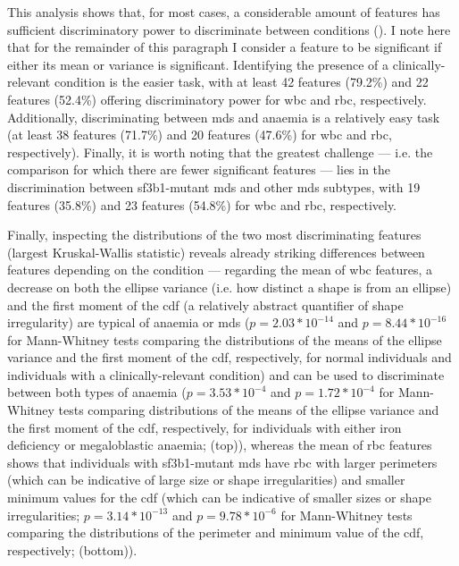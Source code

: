This analysis shows that, for most cases, a considerable amount of features has sufficient discriminatory power to discriminate between conditions (). I note here that for the remainder of this paragraph I consider a feature to be significant if either its mean or variance is significant. Identifying the presence of a clinically-relevant condition is the easier task, with at least 42 features (79.2\%) and 22 features (52.4\%) offering discriminatory power for \ac{wbc} and \ac{rbc}, respectively. Additionally, discriminating between \ac{mds} and anaemia is a relatively easy task (at least 38 features (71.7\%) and 20 features (47.6\%) for \ac{wbc} and \ac{rbc}, respectively). Finally, it is worth noting that the greatest challenge --- i.e. the comparison for which there are fewer significant features --- lies in the discrimination between \ac{sf3b1}-mutant \ac{mds} and other \ac{mds} subtypes, with 19 features (35.8\%) and 23 features (54.8\%) for \ac{wbc} and \ac{rbc}, respectively. 

\begin{figure}[!ht]
    \label{fig:dunn-test-heatmap}
\end{figure}

Finally, inspecting the distributions of the two most discriminating features (largest Kruskal-Wallis statistic) reveals already striking differences between features depending on the condition --- regarding the mean of \ac{wbc} features, a decrease on both the ellipse variance (i.e. how distinct a shape is from an ellipse) and the first moment of the \ac{cdf} (a relatively abstract quantifier of shape irregularity) are typical of anaemia or \ac{mds} ($p=2.03*10^{-14}$ and $p=8.44*10^{-16}$ for Mann-Whitney tests comparing the distributions of the means of the ellipse variance and the first moment of the \ac{cdf}, respectively, for normal individuals and individuals with a clinically-relevant condition) and can be used to discriminate between both types of anaemia ($p=3.53*10^{-4}$ and $p=1.72*10^{-4}$ for Mann-Whitney tests comparing distributions of the means of the ellipse variance and the first moment of the \ac{cdf}, respectively, for individuals with either iron deficiency or megaloblastic anaemia;  (top)), whereas the mean of \ac{rbc} features shows that individuals with \ac{sf3b1}-mutant \ac{mds} have \ac{rbc} with larger perimeters (which can be indicative of large size or shape irregularities) and smaller minimum values for the \ac{cdf} (which can be indicative of smaller sizes or shape irregularities; $p=3.14*10^{-13}$ and $p=9.78*10^{-6}$ for Mann-Whitney tests comparing the distributions of the perimeter and minimum value of the \ac{cdf}, respectively;  (bottom)).

